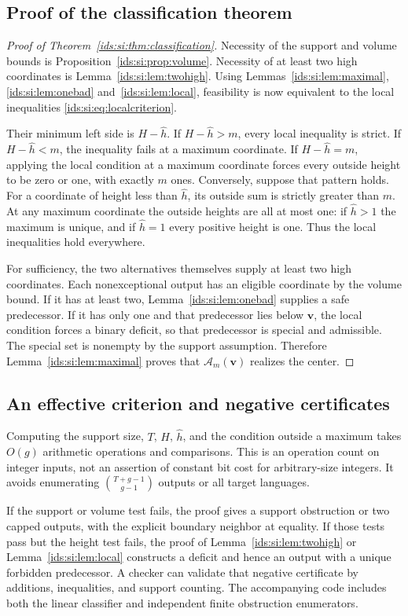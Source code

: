 \documentclass[11pt,letterpaper]{article}
\theoremstyle{definition}\newtheorem{definition}[theorem]{Definition}
\theoremstyle{remark}\newtheorem{remark}[theorem]{Remark}
\theoremstyle{definition}\newtheorem{question}[theorem]{Question}
\newcommand{\Adm}[1]{\mathcal A_m(#1)}
\begin{document}
\subsection{Proof of the classification theorem}
\begin{proof}[Proof of Theorem~\ref{ids:si:thm:classification}]
Necessity of the support and volume bounds is Proposition~\ref{ids:si:prop:volume}.
Necessity of at least two high coordinates is Lemma~\ref{ids:si:lem:twohigh}.
Using Lemmas~\ref{ids:si:lem:maximal}, \ref{ids:si:lem:onebad} and~\ref{ids:si:lem:local}, feasibility is now equivalent
to the local inequalities \eqref{ids:si:eq:localcriterion}.

Their minimum left side is $H-\hat h$. If $H-\hat h>m$, every local inequality is
strict. If $H-\hat h<m$, the inequality fails at a maximum coordinate. If
$H-\hat h=m$, applying the local condition at a maximum coordinate forces every
outside height to be zero or one, with exactly $m$ ones. Conversely, suppose
that pattern holds. For a coordinate of height less than $\hat h$, its outside
sum is strictly greater than $m$. At any maximum coordinate the outside
heights are all at most one: if $\hat h>1$ the maximum is unique, and if $\hat h=1$
every positive height is one. Thus the local inequalities hold everywhere.

For sufficiency, the two alternatives themselves supply at least two high
coordinates. Each nonexceptional output has an eligible coordinate by the
volume bound. If it has at least two, Lemma~\ref{ids:si:lem:onebad} supplies a safe
predecessor. If it has only one and that predecessor lies below $\mathbf v$, the
local condition forces a binary deficit, so that predecessor is special
and admissible. The special set is nonempty by the support assumption.
Therefore Lemma~\ref{ids:si:lem:maximal} proves that $\Adm{\mathbf v}$ realizes the center.
\end{proof}

\subsection{An effective criterion and negative certificates}
Computing the support size, $T$, $H$, $\hat h$, and the condition outside a
maximum takes $O(g)$ arithmetic operations and comparisons. This is an
operation count on integer inputs, not an assertion of constant bit cost
for arbitrary-size integers. It avoids enumerating
$\binom{T+g-1}{g-1}$ outputs or all target languages.

If the support or volume test fails, the proof gives a support obstruction
or two capped outputs, with the explicit boundary neighbor at equality.
If those tests pass but the height test fails, the proof of
Lemma~\ref{ids:si:lem:twohigh} or Lemma~\ref{ids:si:lem:local} constructs a deficit and hence an
output with a unique forbidden predecessor. A checker can validate that
negative certificate by additions, inequalities, and support counting.
The accompanying code includes both the linear classifier and independent
finite obstruction enumerators.
\end{document}
